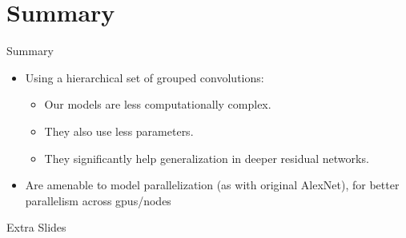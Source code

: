 \documentclass[t,xcolor=dvipsnames]{beamer}
\begin{document}
\usebackgroundtemplate{}


\section*{Summary}

\begin{frame}{Summary}

  \begin{itemize}
	\item Using a hierarchical set of grouped convolutions:
	\begin{itemize}
    	\item Our models are \alert{less computationally complex}.
	    \item They also use \alert{less parameters}.
	    \item They significantly help generalization in deeper residual networks.
	\end{itemize}
	\item Are amenable to \alert{model parallelization} (as with original AlexNet), for better parallelism across gpus/nodes
  \end{itemize}
\end{frame}


\begin{frame}{}
\centering
Extra Slides
\end{frame}
\end{document}
